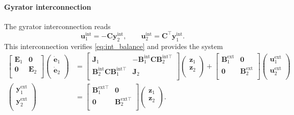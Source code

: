 \paragraph{Gyrator interconnection}
The gyrator interconnection reads
\begin{equation*}
\mathbf{u}_1^{\text{int}} = -\mathbf{C} \mathbf{y}_2^{\text{int}}, \qquad
\mathbf{u}_2^{\text{int}} = \mathbf{C}^\top \mathbf{y}_1^{\text{int}}.
\end{equation*}
This interconnection verifies \eqref{eq:int_balance} and provides the system
\begin{align*}
\begin{bmatrix}
\mathbf{E}_1 & \mathbf{0} \\ \mathbf{0} & \mathbf{E}_2 \\
\end{bmatrix}
\begin{pmatrix}
\dot{\mathbf{e}}_1 \\ \dot{\mathbf{e}}_2 \\
\end{pmatrix} &= 
\begin{bmatrix}
\mathbf{J}_1 & -\mathbf{B}_1^{\text{int}} \mathbf{C} \mathbf{B}_2^{\text{int} \top} \\ 
\mathbf{B}_2^{\text{int}} \mathbf{C} \mathbf{B}_1^{\text{int} \top}  & \mathbf{J}_2 \\
\end{bmatrix}
\begin{pmatrix}
\mathbf{z}_1 \\ 
\mathbf{z}_2 \\
\end{pmatrix}+ 
\begin{bmatrix}
\mathbf{B}_1^{\text{ext}} & \mathbf{0} \\ \mathbf{0} & \mathbf{B}_2^{\text{ext}} \\
\end{bmatrix} 
\begin{pmatrix}
\mathbf{u}_1^{\text{ext}} \\ \mathbf{u}_2^{\text{ext}} \\
\end{pmatrix}  \\
\begin{pmatrix}
\mathbf{y}_1^{\text{ext}} \\ \mathbf{y}_2^{\text{ext}} \\
\end{pmatrix}  &= \begin{bmatrix}
\mathbf{B}_1^{\text{ext} \top} & \mathbf{0} \\
\mathbf{0} & \mathbf{B}_2^{\text{ext} \top} \\
\end{bmatrix} \begin{pmatrix}
\mathbf{z}_1 \\ 
\mathbf{z}_2 \\
\end{pmatrix}.
\end{align*}

